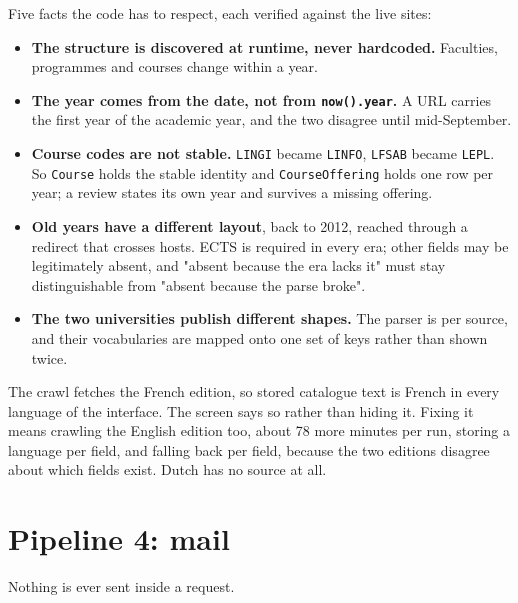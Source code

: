 \documentclass[11pt,a4paper]{article}
\begin{document}
Five facts the code has to respect, each verified against the live sites:

\begin{itemize}[leftmargin=*]
  \item \textbf{The structure is discovered at runtime, never hardcoded.}
        Faculties, programmes and courses change within a year.
  \item \textbf{The year comes from the date, not from \texttt{now().year}.}
        A URL carries the first year of the academic year, and the two
        disagree until mid-September.
  \item \textbf{Course codes are not stable.} \texttt{LINGI} became
        \texttt{LINFO}, \texttt{LFSAB} became \texttt{LEPL}. So
        \texttt{Course} holds the stable identity and \texttt{CourseOffering}
        holds one row per year; a review states its own year and survives a
        missing offering.
  \item \textbf{Old years have a different layout}, back to 2012, reached
        through a redirect that crosses hosts. ECTS is required in every era;
        other fields may be legitimately absent, and "absent because the era
        lacks it" must stay distinguishable from "absent because the parse
        broke".
  \item \textbf{The two universities publish different shapes.} The parser is
        per source, and their vocabularies are mapped onto one set of keys
        rather than shown twice.
\end{itemize}

\begin{openq}
The crawl fetches the French edition, so stored catalogue text is French in
every language of the interface. The screen says so rather than hiding it.
Fixing it means crawling the English edition too, about 78 more minutes per
run, storing a language per field, and falling back per field, because the two
editions disagree about which fields exist. Dutch has no source at all.
\end{openq}

\section{Pipeline 4: mail}

Nothing is ever sent inside a request.
\end{document}
